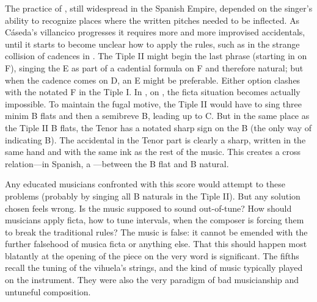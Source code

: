The practice of , still widespread in the Spanish Empire,
depended on the singer's ability to recognize places where the written pitches
needed to be inflected.%
   \Autocite{Berger:Ficta} 
As Cáseda's villancico progresses it requires more and more improvised
accidentals, until it starts to become unclear how to apply the rules, such as
in the strange collision of cadences in .
The Tiple II might begin the last phrase (starting in  on F),
singing the E as part of a cadential formula on F and therefore natural; but
when the cadence comes on D, an E\fl{} might be preferable. 
Either option clashes with the notated F\sh{} in the Tiple I.
In , on , the ficta situation becomes
actually impossible.
To maintain the fugal motive, the Tiple II would have to sing three minim B
flats and then a semibreve B\na, leading up to C.
But in the same place as the Tiple II B flats, the Tenor has a notated sharp
sign on the B (the only way of indicating B\na).
The accidental in the Tenor part is clearly a sharp, written in the same hand
and with the same ink as the rest of the music.
This creates a cross relation---in Spanish, a ---between
the B flat and B natural.


Any educated musicians confronted with this score would attempt to 
these problems (probably by singing all B naturals in the Tiple II).
But any solution chosen feels wrong.
Is the music supposed to sound out-of-tune?
How should musicians apply ficta, how to tune intervals, when the composer is
forcing them to break the traditional rules?
The music is false: it cannot be emended with the further falsehood of musica
ficta or anything else.
That this should happen most blatantly at the opening of the piece on the very
word  is significant.
The fifths recall the tuning of the vihuela's strings, and the kind of music
typically played on the instrument. 
They were also the very paradigm of bad musicianship and untuneful composition.

